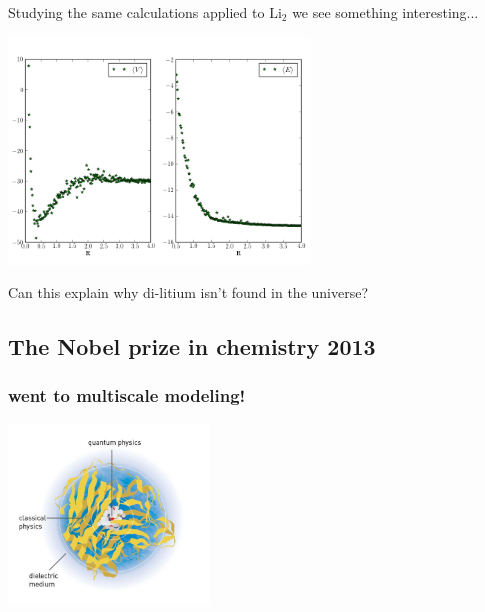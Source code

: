 \documentclass[
paper=128mm:96mm, %
fontsize=11pt, %
pagesize, %
parskip=half-, %
]{scrartcl} %
\theoremstyle{mythmstyle} %
\begin{document}
\clearpage

Studying the same calculations applied to $\mathrm{Li}_2$ we see something interesting...

\begin{center}
 \includegraphics[width=0.6\textwidth]{R_vs_E_lit_pure}
\end{center}

\clearpage

Can this explain why di-litium isn't found in the universe?

\clearpage

\subsection{The Nobel prize in chemistry 2013}

\clearpage
\subsubsection*{went to multiscale modeling!}
\begin{center}
\includegraphics[width=0.4\textwidth]{multiscale}
\end{center}

\clearpage
\end{document}
